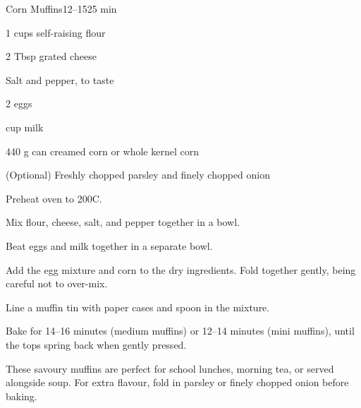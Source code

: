 \begin{recipebox}{Corn Muffins}{12--15}{25 min}
\begin{ingredients}
  \item 1 cups self-raising flour
  \item 2 Tbsp grated cheese
  \item Salt and pepper, to taste
  \item 2 eggs
  \item {} cup milk
  \item 440 g can creamed corn or whole kernel corn
  \item (Optional) Freshly chopped parsley and finely chopped onion
\end{ingredients}

\begin{method}
  \item Preheat oven to 200\degree C.  
  \item Mix flour, cheese, salt, and pepper together in a bowl.  
  \item Beat eggs and milk together in a separate bowl.  
  \item Add the egg mixture and corn to the dry ingredients. Fold together gently, being careful not to over-mix.  
  \item Line a muffin tin with paper cases and spoon in the mixture.  
  \item Bake for 14–16 minutes (medium muffins) or 12–14 minutes (mini muffins), until the tops spring back when gently pressed.  
\end{method}

\begin{notes}
These savoury muffins are perfect for school lunches, morning tea, or served alongside soup.  
For extra flavour, fold in parsley or finely chopped onion before baking.  
\end{notes}
\end{recipebox}

